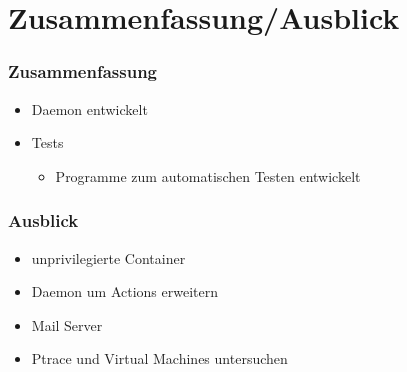 \section{Zusammenfassung/Ausblick}

\begin{frame}
  \frametitle{Zusammenfassung}
  \begin{itemize}
   \item Daemon entwickelt
   \item Tests
   \begin{itemize}
    \item Programme zum automatischen Testen entwickelt
   \end{itemize}
  \end{itemize}
\end{frame}

\begin{frame}
 \frametitle{Ausblick}
 \begin{itemize}
  \item unprivilegierte Container
  \item Daemon um Actions erweitern
  \item Mail Server
  \item Ptrace und Virtual Machines untersuchen
 \end{itemize}

\end{frame}
